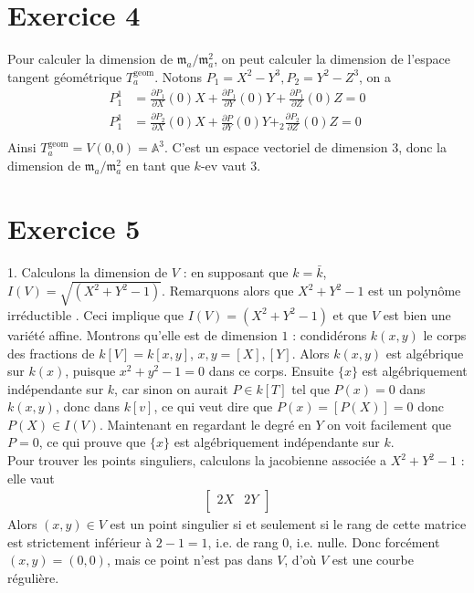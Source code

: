     \section{Exercice 4}
        Pour calculer la dimension de $\mathfrak{m}_a/\mathfrak{m}_a^2$, on peut calculer la dimension de l'espace tangent géométrique $T_a^\mathrm{geom}$. Notons $P_1 = X^2 - Y^3, P_2 = Y^2 - Z^3$, on a 
        \begin{align*}
            P_1^1 &= \frac{\partial P_1}{\partial X}(0)X + \frac{\partial P_1}{\partial Y}(0)Y + \frac{\partial P_1}{\partial Z}(0)Z = 0 \\
            P_1^1 &= \frac{\partial P_2}{\partial X}(0)X + \frac{\partial P}{\partial Y}(0)Y +_2 \frac{\partial P_2}{\partial Z}(0)Z = 0 \\
        \end{align*}
        Ainsi $T_a^\mathrm{geom} = V(0,0) = \mathbb{A}^3$. C'est un espace vectoriel de dimension $3$, donc la dimension de $\mathfrak{m}_a/\mathfrak{m}_a^2$ en tant que $k$-ev vaut $3$.

    \section{Exercice 5}
        \begin{question}{1.}
            Calculons la dimension de $V$ : en supposant que $k = \bar k$, $I(V) = \sqrt{(X^2 + Y^2 - 1)}$. Remarquons alors que $X^2 + Y^2 - 1$ est un polynôme irréductible . Ceci implique que $I(V) = (X^2 + Y^2 - 1)$ et que $V$ est bien une variété affine. Montrons qu'elle est de dimension $1$ : condidérons $k(x,y)$ le corps des fractions de $k[V] = k[x,y]$, $x,y = [X],[Y]$. Alors $k(x,y)$ est algébrique sur $k(x)$, puisque $x^2 + y^2 - 1 = 0$ dans ce corps. Ensuite $\{x\}$ est algébriquement indépendante sur $k$, car sinon on aurait $P \in k[T]$ tel que $P(x) = 0$ dans $k(x,y)$, donc dans $k[v]$, ce qui veut dire que $P(x) = [P(X)] = 0$ donc $P(X) \in I(V)$. Maintenant en regardant le degré en $Y$ on voit facilement que $P = 0$, ce qui prouve que $\{x\}$ est algébriquement indépendante sur $k$. \\ 
            Pour trouver les points singuliers, calculons la jacobienne associée a $X^2 + Y^2 - 1$ : elle vaut
            \begin{align*}
                \begin{bmatrix}
                    2X & 2Y \\
                \end{bmatrix}
            \end{align*}
            Alors $(x,y) \in V$ est un point singulier si et seulement si le rang de cette matrice est strictement inférieur à $2 - 1 = 1$, i.e. de rang $0$, i.e. nulle. Donc forcément $(x,y)  = (0,0)$, mais ce point n'est pas dans $V$, d'où $V$ est une courbe régulière.
        \end{question}
        
